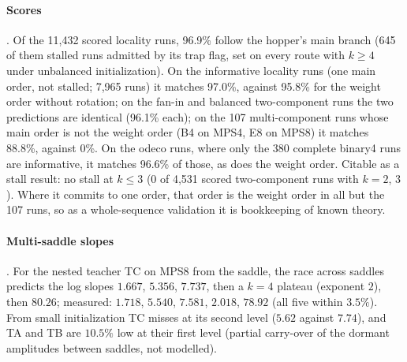 \paragraph{Scores} \empirical.
Of the 11,432 scored locality runs, 96.9\% follow the hopper's main branch (645 of them stalled runs admitted by its
trap flag, set on every route with $k\ge4$ under unbalanced initialization). On the informative locality runs (one
main order, not stalled; 7,965 runs) it matches 97.0\%, against 95.8\% for the weight order without rotation; on the
fan-in and balanced two-component runs the two predictions are identical (96.1\% each); on the 107 multi-component
runs whose main order is not the weight order (B4 on MPS4, E8 on MPS8) it matches 88.8\%, against 0\%. On the odeco
runs, where only the 380 complete binary4 runs are informative, it matches 96.6\% of those, as does the weight
order. Citable as a stall result: no stall at $k\le3$ (0 of 4,531 scored
two-component runs with $k=2$, $3$). Where it commits to one order, that order is the weight order in all but the 107
runs, so as a whole-sequence validation it is bookkeeping of known theory.

\paragraph{Multi-saddle slopes} \empirical{} \newresult.
For the nested teacher TC on MPS8 from the saddle, the race across saddles predicts the log slopes $1.667$, $5.356$,
$7.737$, then a $k=4$ plateau (exponent $2$), then $80.26$; measured: $1.718$, $5.540$, $7.581$, $2.018$, $78.92$ (all
five within $3.5\%$). From small initialization TC misses at its second level ($5.62$ against $7.74$), and TA and TB
are $10.5\%$ low at their first level (partial carry-over of the dormant amplitudes between saddles, not modelled).

